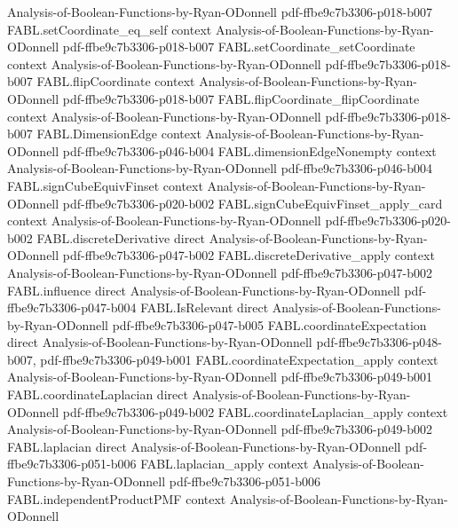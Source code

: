 \begin{theorem}
  {Analysis-of-Boolean-Functions-by-Ryan-ODonnell}
  {pdf-ffbe9c7b3306-p018-b007}
\proofstep
  {FABL.setCoordinate_eq_self}
  {context}
  {Analysis-of-Boolean-Functions-by-Ryan-ODonnell}
  {pdf-ffbe9c7b3306-p018-b007}
\proofstep
  {FABL.setCoordinate_setCoordinate}
  {context}
  {Analysis-of-Boolean-Functions-by-Ryan-ODonnell}
  {pdf-ffbe9c7b3306-p018-b007}
\proofstep
  {FABL.flipCoordinate}
  {context}
  {Analysis-of-Boolean-Functions-by-Ryan-ODonnell}
  {pdf-ffbe9c7b3306-p018-b007}
\proofstep
  {FABL.flipCoordinate_flipCoordinate}
  {context}
  {Analysis-of-Boolean-Functions-by-Ryan-ODonnell}
  {pdf-ffbe9c7b3306-p018-b007}
\proofstep
  {FABL.DimensionEdge}
  {context}
  {Analysis-of-Boolean-Functions-by-Ryan-ODonnell}
  {pdf-ffbe9c7b3306-p046-b004}
\proofstep
  {FABL.dimensionEdgeNonempty}
  {context}
  {Analysis-of-Boolean-Functions-by-Ryan-ODonnell}
  {pdf-ffbe9c7b3306-p046-b004}
\proofstep
  {FABL.signCubeEquivFinset}
  {context}
  {Analysis-of-Boolean-Functions-by-Ryan-ODonnell}
  {pdf-ffbe9c7b3306-p020-b002}
\proofstep
  {FABL.signCubeEquivFinset_apply_card}
  {context}
  {Analysis-of-Boolean-Functions-by-Ryan-ODonnell}
  {pdf-ffbe9c7b3306-p020-b002}
\proofstep
  {FABL.discreteDerivative}
  {direct}
  {Analysis-of-Boolean-Functions-by-Ryan-ODonnell}
  {pdf-ffbe9c7b3306-p047-b002}
\proofstep
  {FABL.discreteDerivative_apply}
  {context}
  {Analysis-of-Boolean-Functions-by-Ryan-ODonnell}
  {pdf-ffbe9c7b3306-p047-b002}
\proofstep
  {FABL.influence}
  {direct}
  {Analysis-of-Boolean-Functions-by-Ryan-ODonnell}
  {pdf-ffbe9c7b3306-p047-b004}
\proofstep
  {FABL.IsRelevant}
  {direct}
  {Analysis-of-Boolean-Functions-by-Ryan-ODonnell}
  {pdf-ffbe9c7b3306-p047-b005}
\proofstep
  {FABL.coordinateExpectation}
  {direct}
  {Analysis-of-Boolean-Functions-by-Ryan-ODonnell}
  {pdf-ffbe9c7b3306-p048-b007,
    pdf-ffbe9c7b3306-p049-b001}
\proofstep
  {FABL.coordinateExpectation_apply}
  {context}
  {Analysis-of-Boolean-Functions-by-Ryan-ODonnell}
  {pdf-ffbe9c7b3306-p049-b001}
\proofstep
  {FABL.coordinateLaplacian}
  {direct}
  {Analysis-of-Boolean-Functions-by-Ryan-ODonnell}
  {pdf-ffbe9c7b3306-p049-b002}
\proofstep
  {FABL.coordinateLaplacian_apply}
  {context}
  {Analysis-of-Boolean-Functions-by-Ryan-ODonnell}
  {pdf-ffbe9c7b3306-p049-b002}
\proofstep
  {FABL.laplacian}
  {direct}
  {Analysis-of-Boolean-Functions-by-Ryan-ODonnell}
  {pdf-ffbe9c7b3306-p051-b006}
\proofstep
  {FABL.laplacian_apply}
  {context}
  {Analysis-of-Boolean-Functions-by-Ryan-ODonnell}
  {pdf-ffbe9c7b3306-p051-b006}
\proofstep
  {FABL.independentProductPMF}
  {context}
  {Analysis-of-Boolean-Functions-by-Ryan-ODonnell}

\end{theorem}
